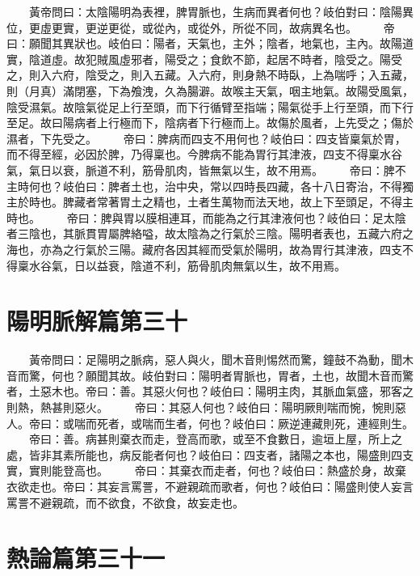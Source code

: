 　　黃帝問曰：太陰陽明為表裡，脾胃脈也，生病而異者何也？岐伯對曰：陰陽異位，更虛更實，更逆更從，或從內，或從外，所從不同，故病異名也。
　　帝曰：願聞其異狀也。岐伯曰：陽者，天氣也，主外；陰者，地氣也，主內。故陽道實，陰道虛。故犯賊風虛邪者，陽受之；食飲不節，起居不時者，陰受之。陽受之，則入六府，陰受之，則入五藏。入六府，則身熱不時臥，上為喘呼；入五藏，則（月真）滿閉塞，下為飧洩，久為腸澼。故喉主天氣，咽主地氣。故陽受風氣，陰受濕氣。故陰氣從足上行至頭，而下行循臂至指端；陽氣從手上行至頭，而下行至足。故曰陽病者上行極而下，陰病者下行極而上。故傷於風者，上先受之；傷於濕者，下先受之。
　　帝曰：脾病而四支不用何也？岐伯曰：四支皆稟氣於胃，而不得至經，必因於脾，乃得稟也。今脾病不能為胃行其津液，四支不得稟水谷氣，氣日以衰，脈道不利，筋骨肌肉，皆無氣以生，故不用焉。
　　帝曰：脾不主時何也？岐伯曰：脾者土也，治中央，常以四時長四藏，各十八日寄治，不得獨主於時也。脾藏者常著胃土之精也，土者生萬物而法天地，故上下至頭足，不得主時也。
　　帝曰：脾與胃以膜相連耳，而能為之行其津液何也？岐伯曰：足太陰者三陰也，其脈貫胃屬脾絡嗌，故太陰為之行氣於三陰。陽明者表也，五藏六府之海也，亦為之行氣於三陽。藏府各因其經而受氣於陽明，故為胃行其津液，四支不得稟水谷氣，日以益衰，陰道不利，筋骨肌肉無氣以生，故不用焉。


\section{陽明脈解篇第三十}

　　黃帝問曰：足陽明之脈病，惡人與火，聞木音則惕然而驚，鐘鼓不為動，聞木音而驚，何也？願聞其故。岐伯對曰：陽明者胃脈也，胃者，土也，故聞木音而驚者，土惡木也。帝曰：善。其惡火何也？岐伯曰：陽明主肉，其脈血氣盛，邪客之則熱，熱甚則惡火。
　　帝曰：其惡人何也？岐伯曰：陽明厥則喘而惋，惋則惡人。帝曰：或喘而死者，或喘而生者，何也？岐伯曰：厥逆連藏則死，連經則生。
　　帝曰：善。病甚則棄衣而走，登高而歌，或至不食數日，逾垣上屋，所上之處，皆非其素所能也，病反能者何也？岐伯曰：四支者，諸陽之本也，陽盛則四支實，實則能登高也。
　　帝曰：其棄衣而走者，何也？岐伯曰：熱盛於身，故棄衣欲走也。帝曰：其妄言罵詈，不避親疏而歌者，何也？岐伯曰：陽盛則使人妄言罵詈不避親疏，而不欲食，不欲食，故妄走也。


\section{熱論篇第三十一}

